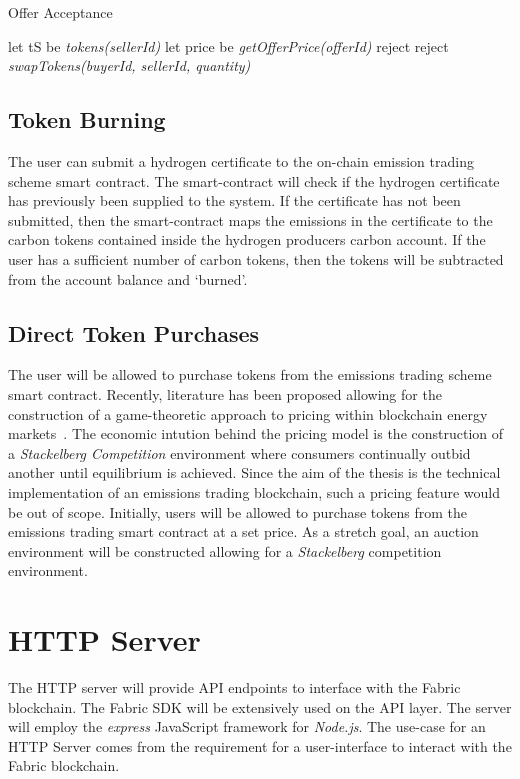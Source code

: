 \begin{algorithm}
    \caption{Offer Acceptance}
    \begin{algorithmic}[1]
        \State let tS be \textit{tokens(sellerId)}
        \State let price be \textit{getOfferPrice(offerId)}
        reject
        \EndIf
        reject
        \EndIf
        \State \textit{swapTokens(buyerId, sellerId, quantity)}
        \EndProcedure
    \end{algorithmic}
    \label{alg:offer}
\end{algorithm}

\subsection{Token Burning}
The user can submit a hydrogen certificate to the
on-chain emission trading scheme smart contract. The smart-contract will check if the hydrogen certificate
has previously been supplied to the system. If the
certificate has not been submitted, then the smart-contract
maps the emissions in the certificate to the carbon tokens
contained inside the hydrogen producers carbon account. If the
user has a sufficient number of carbon tokens, then the tokens
will be subtracted from the account balance and `burned'.

\subsection{Direct Token Purchases}
The user will be allowed to purchase tokens from the
emissions trading scheme smart contract. Recently, literature
has been proposed allowing for the
construction of a game-theoretic approach to
pricing within blockchain energy markets~\cite{JIANG2020115239}.
The economic intution behind the pricing model is the
construction of a \textit{Stackelberg Competition} environment
where consumers continually outbid another until
equilibrium is achieved. Since the aim of the thesis
is the technical implementation of an emissions trading
blockchain, such a pricing feature would be out of scope.
Initially, users will be allowed to purchase tokens from the
emissions trading smart contract at a set price. As a
stretch goal, an auction environment will be constructed
allowing for a \textit{Stackelberg} competition
environment.

\section{HTTP Server}
The HTTP server will provide API endpoints to interface
with the Fabric blockchain. The Fabric SDK will be
extensively used on the API layer. The server will
employ the \textit{express} JavaScript framework
for \textit{Node.js}. The use-case for an HTTP Server
comes from the requirement for a user-interface to
interact with the Fabric blockchain.

